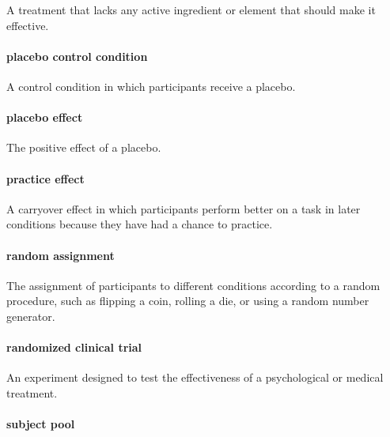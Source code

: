 \documentclass[
]{krantz}
\begin{document}
A treatment that lacks any active ingredient or element that should make it effective.

\hypertarget{placebo-control-condition}{%
\paragraph*{placebo control condition}\label{placebo-control-condition}}

A control condition in which participants receive a placebo.

\hypertarget{placebo-effect}{%
\paragraph*{placebo effect}\label{placebo-effect}}

The positive effect of a placebo.

\hypertarget{practice-effect}{%
\paragraph*{practice effect}\label{practice-effect}}

A carryover effect in which participants perform better on a task in later conditions because they have had a chance to practice.

\hypertarget{random-assignment-1}{%
\paragraph*{random assignment}\label{random-assignment-1}}

The assignment of participants to different conditions according to a random procedure, such as flipping a coin, rolling a die, or using a random number generator.

\hypertarget{randomized-clinical-trial}{%
\paragraph*{randomized clinical trial}\label{randomized-clinical-trial}}

An experiment designed to test the effectiveness of a psychological or medical treatment.

\hypertarget{subject-pool}{%
\paragraph*{subject pool}\label{subject-pool}}
\end{document}
